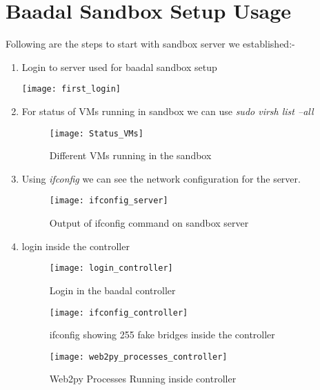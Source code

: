 \chapter{Baadal Sandbox Setup Usage}


Following are the steps to start with sandbox server we established:-

\begin{enumerate}
    \item Login to server used for baadal sandbox setup
    
\begin{minipage}{\linewidth}
\centering
\texttt{[image: first\_login]}
\end{minipage}

\newpage
\item For status of VMs running in sandbox we can use \textit{sudo virsh list --all}
\begin{figure}[h]
\caption{Different VMs running in the sandbox}
\centering
\texttt{[image: Status\_VMs]}
\end{figure}


\item Using \textit{ifconfig} we can see the network configuration for the server.
\begin{figure}[h]
\caption{Output of ifconfig command on sandbox server}
\centering
\texttt{[image: ifconfig\_server]}
\end{figure}

\newpage
\item login inside the controller

\begin{figure}[h]
\caption{Login in the baadal controller}
\centering
\texttt{[image: login\_controller]}
\end{figure}


\begin{figure}[h]
\caption{ifconfig showing 255 fake bridges inside the controller}
\centering
\texttt{[image: ifconfig\_controller]}
\end{figure}

\begin{figure}
\caption{Web2py Processes Running inside controller}
\centering
\texttt{[image: web2py\_processes\_controller]}
\end{figure}


\end{enumerate}
